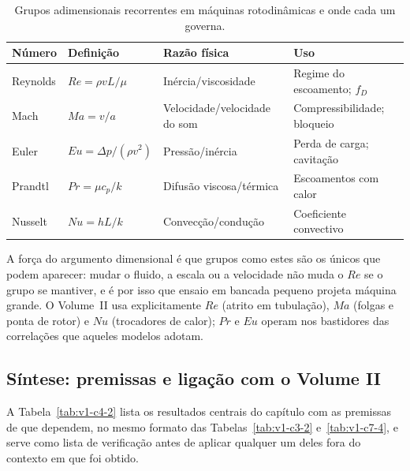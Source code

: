\documentclass[12pt,a4paper]{article}
\numberwithin{equation}{section}
\numberwithin{table}{section}
\numberwithin{figure}{section}
\begin{document}
\begin{table}[H]
\centering
\small
\caption[Grupos adimensionais de escoamento]{Grupos adimensionais
recorrentes em máquinas rotodinâmicas e onde cada um governa.}
\label{tab:v1-c4-1}
\begin{tabular}{@{}llll@{}}
\toprule
\textbf{Número} & \textbf{Definição} & \textbf{Razão física} & \textbf{Uso} \\
\midrule
Reynolds & $Re = \rho v L / \mu$ & Inércia/viscosidade & Regime do escoamento; $f_D$ \\
Mach & $Ma = v/a$ & Velocidade/velocidade do som & Compressibilidade; bloqueio \\
Euler & $Eu = \Delta p / (\rho v^2)$ & Pressão/inércia & Perda de carga; cavitação \\
Prandtl & $Pr = \mu c_p / k$ & Difusão viscosa/térmica & Escoamentos com calor \\
Nusselt & $Nu = hL/k$ & Convecção/condução & Coeficiente convectivo \\
\bottomrule
\end{tabular}
\end{table}

A força do argumento dimensional é que grupos como estes são os únicos que
podem aparecer: mudar o fluido, a escala ou a velocidade não muda o $Re$ se o
grupo se mantiver, e é por isso que ensaio em bancada pequeno projeta máquina
grande. O Volume~II usa explicitamente $Re$ (atrito em tubulação), $Ma$
(folgas e ponta de rotor) e $Nu$ (trocadores de calor); $Pr$ e $Eu$ operam
nos bastidores das correlações que aqueles modelos adotam.

\subsection{Síntese: premissas e ligação com o Volume
II}\label{sub:v1-c4-sintese}

A Tabela~\ref{tab:v1-c4-2} lista os resultados centrais do capítulo com as
premissas de que dependem, no mesmo formato das
Tabelas~\ref{tab:v1-c3-2} e~\ref{tab:v1-c7-4}, e serve como lista de
verificação antes de aplicar qualquer um deles fora do contexto em que foi
obtido.
\end{document}

